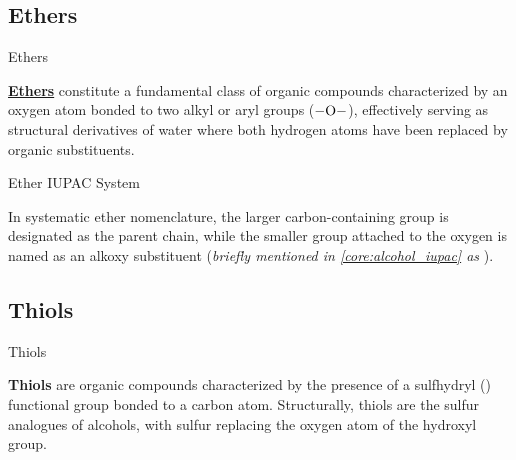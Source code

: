 \documentclass[10pt]{article}
\begin{document}
  \subsection{Ethers}

    \begin{core}{Ethers}

      \href{../ethers/ethers.pdf}{\textbf{Ethers}} constitute a fundamental class of organic compounds characterized by an oxygen atom bonded to two alkyl or aryl groups ($\ce{-O-}$), effectively serving as structural derivatives of water where both hydrogen atoms have been replaced by organic substituents.

    \end{core}

    \begin{core}{Ether IUPAC System}

      In systematic ether nomenclature, the larger carbon-containing group is designated as the parent chain, while the smaller group attached to the oxygen is named as an alkoxy substituent (\textit{briefly mentioned in \autoref{core:alcohol_iupac} as }).


    \end{core}

  \subsection{Thiols}

    \begin{core}{Thiols}

      \textbf{Thiols} are organic compounds characterized by the presence of a sulfhydryl (\textit{}) functional group bonded to a carbon atom. Structurally, thiols are the sulfur analogues of alcohols, with sulfur replacing the oxygen atom of the hydroxyl group.

    \end{core}
\end{document}
